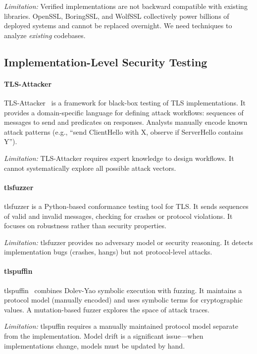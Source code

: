\documentclass[10pt,twocolumn]{article}
\begin{document}
\emph{Limitation:} Verified implementations are not backward compatible with existing libraries. OpenSSL, BoringSSL, and WolfSSL collectively power billions of deployed systems and cannot be replaced overnight. We need techniques to analyze \emph{existing} codebases.

\subsection{Implementation-Level Security Testing}

\paragraph{TLS-Attacker}
TLS-Attacker~\cite{somorovsky2016systematic} is a framework for black-box testing of TLS implementations. It provides a domain-specific language for defining attack workflows: sequences of messages to send and predicates on responses. Analysts manually encode known attack patterns (e.g., ``send ClientHello with X, observe if ServerHello contains Y'').

\emph{Limitation:} TLS-Attacker requires expert knowledge to design workflows. It cannot systematically explore all possible attack vectors.

\paragraph{tlsfuzzer}
tlsfuzzer is a Python-based conformance testing tool for TLS. It sends sequences of valid and invalid messages, checking for crashes or protocol violations. It focuses on robustness rather than security properties.

\emph{Limitation:} tlsfuzzer provides no adversary model or security reasoning. It detects implementation bugs (crashes, hangs) but not protocol-level attacks.

\paragraph{tlspuffin}
tlspuffin~\cite{ammann2024dyfuzzing} combines Dolev-Yao symbolic execution with fuzzing. It maintains a protocol model (manually encoded) and uses symbolic terms for cryptographic values. A mutation-based fuzzer explores the space of attack traces.

\emph{Limitation:} tlspuffin requires a manually maintained protocol model separate from the implementation. Model drift is a significant issue—when implementations change, models must be updated by hand.
\end{document}
